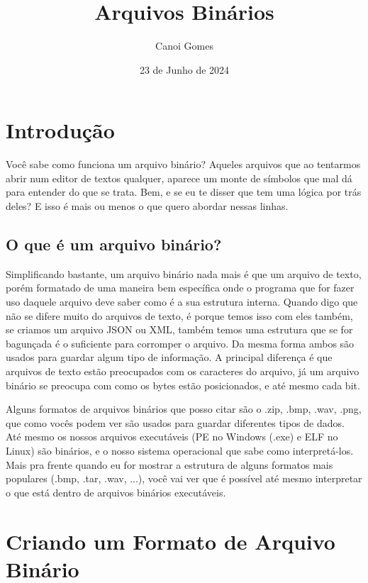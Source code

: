 \documentclass[a4paper,oneside,12pt]{article}
\title{Arquivos Binários}
\author{Canoi Gomes}
\date{23 de Junho de 2024}
\begin{document}
\maketitle
\newpage

\tableofcontents
\newpage

\section{Introdução}

Você sabe como funciona um arquivo binário? Aqueles arquivos que ao tentarmos abrir num editor de textos qualquer, aparece um monte de símbolos que mal dá para entender do que se trata. Bem, e se eu te disser que tem uma lógica por trás deles? E isso é mais ou menos o que quero abordar nessas linhas.

\subsection{O que é um arquivo binário?}

Simplificando bastante, um arquivo binário nada mais é que um arquivo de texto, porém formatado de uma maneira bem específica onde o programa que for fazer uso daquele arquivo deve saber como é a sua estrutura interna. Quando digo que não se difere muito do arquivos de texto, é porque temos isso com eles também, se criamos um arquivo JSON ou XML, também temos uma estrutura que se for bagunçada é o suficiente para corromper o arquivo.
Da mesma forma ambos são usados para guardar algum tipo de informação. A principal diferença é que arquivos de texto estão preocupados com os caracteres do arquivo, já um arquivo binário se preocupa com como os bytes estão posicionados, e até mesmo cada bit.

Alguns formatos de arquivos binários que posso citar são o .zip, .bmp, .wav, .png, que como vocês podem ver são usados para guardar diferentes tipos de dados. Até mesmo os nossos arquivos executáveis (PE no Windows (.exe) e ELF no Linux) são binários, e o nosso sistema operacional que sabe como interpretá-los. Mais pra frente quando eu for mostrar a estrutura de alguns formatos mais populares (.bmp, .tar, .wav, ...), você vai ver que é possível até mesmo interpretar o que está dentro de arquivos binários executáveis.

\section{Criando um Formato de Arquivo Binário}
\end{document}
